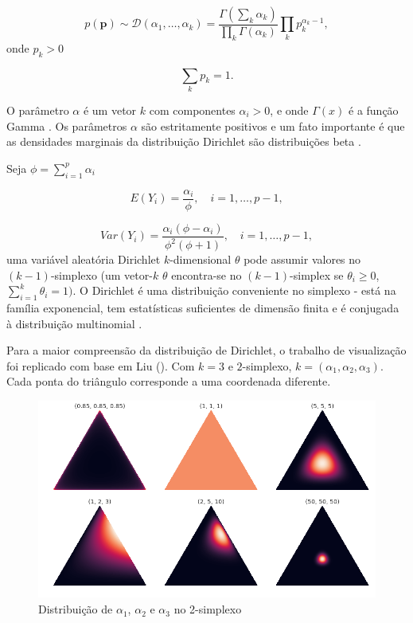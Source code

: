 \begin{equation}
p(\boldsymbol {p}) \sim \mathcal{D}(\alpha_{1},\dots,\alpha_{k}) = \frac {\Gamma(\sum_{k} \alpha_{k})}{\prod_{k}\Gamma(\alpha_{k})} \prod_{k} p_{k}^{\alpha_{k}-1},
\end{equation}
%
onde $p_{k} > 0$ 

\begin{equation}
\sum_{k} p_{k} = 1.
\end{equation}    

O parâmetro $\alpha$ é um vetor $k$ com componentes $\alpha_i > 0$, e onde $\Gamma(x)$ é a função Gamma \cite{blei2003}.
Os parâmetros $\alpha$ são estritamente positivos e um fato importante é que as densidades marginais da distribuição Dirichlet são distribuições beta \cite{gomes2005}.

Seja $\phi = \sum_{i=1}^{p} \alpha_i$


\begin{equation}
E(Y_i) = \frac{\alpha_i}{\phi}, \quad i = 1, \dots, p-1,
\end{equation} 

\begin{equation} \label{dir:var}
Var(Y_i) = \frac{\alpha_i(\phi-\alpha_i)}{\phi^2(\phi+1)}, \quad i = 1, \dots, p-1,
\end{equation} 
%
uma variável aleatória Dirichlet $k$-dimensional $\theta$ pode assumir valores no $(k-1)$-simplexo (um vetor-$k$ $\theta$ encontra-se no $(k-1)$-simplex se $\theta_i \geq 0$,
$\sum_{i=1}^{k} \theta_i =1)$. 
O Dirichlet é uma distribuição conveniente no simplexo - está na família exponencial, tem estatísticas suficientes de dimensão finita e é conjugada à distribuição multinomial \cite{blei2003}.


Para a maior compreensão da distribuição de Dirichlet, o trabalho de visualização foi replicado com base em Liu (\citeyear{liu2019}). Com $k=3$ e $2$-simplexo, $k=(\alpha_1, \alpha_2, \alpha_3)$. Cada ponta do triângulo corresponde a uma coordenada diferente. 


\begin{figure}[!h]
	\centering
	\includegraphics[keepaspectratio=true,scale=0.4]{figuras/dist-diri-simplex.png}
	\caption{Distribuição de $\alpha_1$, $\alpha_2$ e $\alpha_3$ no 2-simplexo}
	\label{fig08}
\end{figure}


